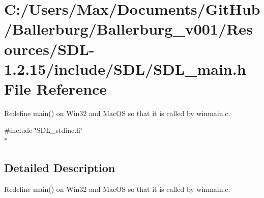 \section{C\+:/\+Users/\+Max/\+Documents/\+Git\+Hub/\+Ballerburg/\+Ballerburg\+\_\+v001/\+Resources/\+S\+D\+L-\/1.2.15/include/\+S\+D\+L/\+S\+D\+L\+\_\+main.h File Reference}
\label{_s_d_l__main_8h}


Redefine main() on Win32 and Mac\+O\+S so that it is called by winmain.\+c.  


{\ttfamily \#include \char`\"{}S\+D\+L\+\_\+stdinc.\+h\char`\"{}}\\*


\subsection{Detailed Description}
Redefine main() on Win32 and Mac\+O\+S so that it is called by winmain.\+c. 

